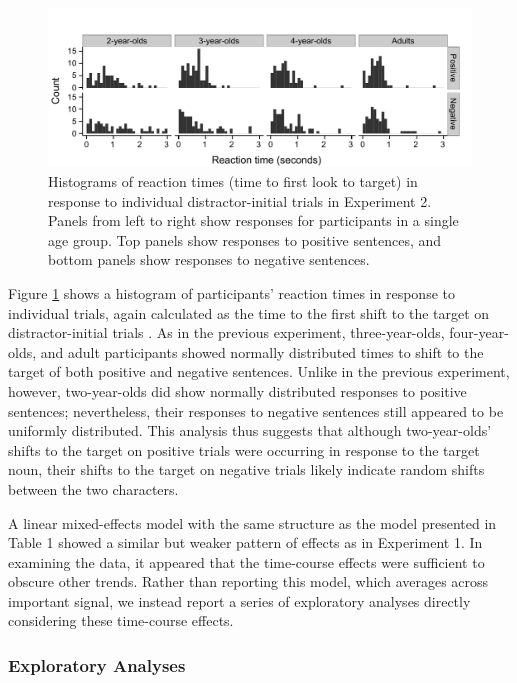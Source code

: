 \documentclass[man]{apa2}
\begin{document}
\begin{figure}
\begin{center} 
\includegraphics[width=6in]{RTs_something.pdf}
\caption{\label{fig:e2rt} Histograms of reaction times (time to first look to target) in response to individual distractor-initial trials in Experiment 2.  Panels from left to right show responses for participants in a single age group.  Top panels show responses to positive sentences, and bottom panels show responses to negative sentences.}
\end{center} 
\end{figure}

Figure \ref{fig:e2rt} shows a histogram of participants' reaction times in response to individual trials, again calculated as the time to the first shift to the target on distractor-initial trials \cite{fernald2008}. As in the previous experiment, three-year-olds, four-year-olds, and adult participants showed normally distributed times to shift to the target of both positive and negative sentences.  Unlike in the previous experiment, however, two-year-olds did show normally distributed responses to positive sentences; nevertheless, their responses to negative sentences still appeared to be uniformly distributed.  This analysis thus suggests that although two-year-olds' shifts to the target on positive trials were occurring in response to the target noun, their shifts to the target on negative trials likely indicate random shifts between the two characters.  

A linear mixed-effects model with the same structure as the model presented in Table 1 showed a similar but weaker pattern of effects as in Experiment 1. In examining the data, it appeared that the time-course effects were sufficient to obscure other trends. Rather than reporting this model, which averages across important signal, we instead report a series of exploratory analyses directly considering these time-course effects.

\subsubsection{Exploratory Analyses}
\end{document}
